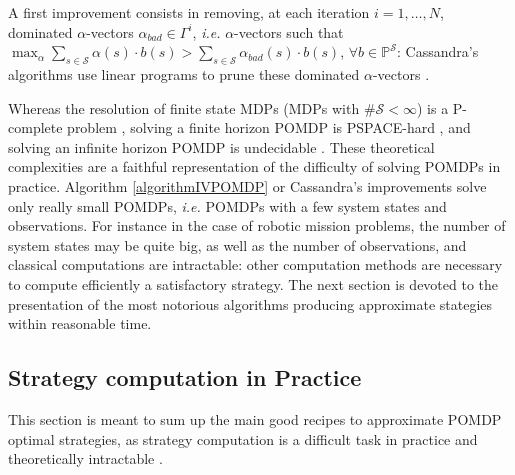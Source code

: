 A first improvement consists in removing, 
at each iteration $i=1,\ldots,N$, 
dominated $\alpha$-vectors $\alpha_{bad} \in \Gamma^i$,
\textit{i.e.} $\alpha$-vectors such that 
$\max_{\alpha} \sum_{s \in \mathcal{S}} \alpha(s) \cdot b(s) > \sum_{s \in \mathcal{S}} \alpha_{bad}(s) \cdot b(s)$, 
$\forall b \in \mathbb{P}^{\mathcal{S}}$: 
Cassandra's algorithms use linear programs 
to prune these dominated $\alpha$-vectors 
\cite{Cassandra:1994:AOP:199480.199520,Cassandra97incrementalpruning}.

Whereas the resolution of finite state MDPs (MDPs with $\# \mathcal{S} < \infty$) is a P-complete problem \cite{Papadimitriou:1987},
solving a finite horizon POMDP is PSPACE-hard \cite{Papadimitriou:1987}, 
and solving an infinite horizon POMDP is undecidable \cite{Madani:1999:UPP:315149.315395}.
These theoretical complexities are a faithful representation of the difficulty of
solving POMDPs in practice. Algorithm \ref{algorithmIVPOMDP} or 
Cassandra's improvements \cite{Cassandra:1994:AOP:199480.199520,Cassandra97incrementalpruning}
solve only really small POMDPs, \textit{i.e.} POMDPs with a few system states and observations.
For instance in the case of robotic mission problems, 
the number of system states may be quite big,
as well as the number of observations,
and classical computations are intractable:
other computation methods are necessary to compute efficiently
a satisfactory strategy. The next section is devoted to the presentation
of the most notorious algorithms producing approximate stategies
within reasonable time.

\subsection{Strategy computation in Practice}
\label{section_SAalgo}
This section is meant to sum up the main good recipes 
to approximate POMDP optimal strategies,
as strategy computation is a difficult task in practice
and theoretically intractable
\cite{Papadimitriou:1987,Madani:1999:UPP:315149.315395}.

